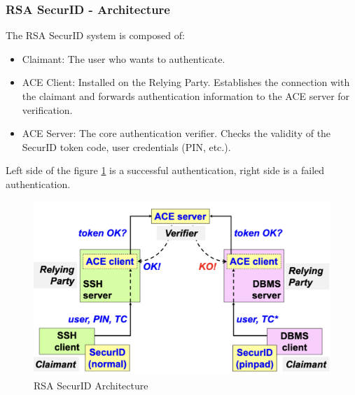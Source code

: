 \subsubsection*{RSA SecurID - Architecture}

The RSA SecurID system is composed of:
\begin{itemize}
    \item Claimant: The user who wants to authenticate.
    \item ACE Client: Installed on the Relying Party. Establishes the connection with the claimant and forwards authentication information to the ACE server for verification.
    \item ACE Server: The core authentication verifier. Checks the validity of the SecurID token code, user credentials (PIN, etc.).
\end{itemize}
Left side of the figure \ref{fig:secarch} is a successful authentication, right side is a failed authentication.

\begin{figure}[H]
    \centering
    \includegraphics[width=0.5\linewidth]{Images/Authentication/secarch.png}
    \caption{RSA SecurID Architecture}
    \label{fig:secarch}
\end{figure}

